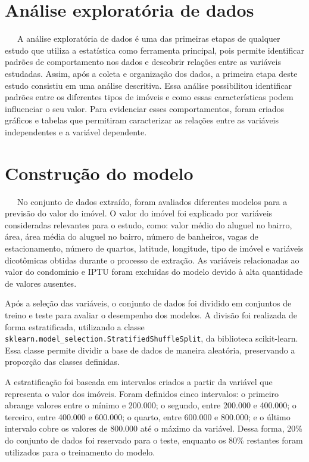 \documentclass[
  12pt,
  a4paper,
]{scrreprt}
\begin{document}
\section{Análise exploratória de
dados}\label{anuxe1lise-exploratuxf3ria-de-dados}

~~~A análise exploratória de dados é uma das primeiras etapas de
qualquer estudo que utiliza a estatística como ferramenta principal,
pois permite identificar padrões de comportamento nos dados e descobrir
relações entre as variáveis estudadas. Assim, após a coleta e
organização dos dados, a primeira etapa deste estudo consistiu em uma
análise descritiva. Essa análise possibilitou identificar padrões entre
os diferentes tipos de imóveis e como essas características podem
influenciar o seu valor. Para evidenciar esses comportamentos, foram
criados gráficos e tabelas que permitiram caracterizar as relações entre
as variáveis independentes e a variável dependente.

\section{Construção do modelo}\label{construuxe7uxe3o-do-modelo}

~~~No conjunto de dados extraído, foram avaliados diferentes modelos
para a previsão do valor do imóvel. O valor do imóvel foi explicado por
variáveis consideradas relevantes para o estudo, como: valor médio do
aluguel no bairro, área, área média do aluguel no bairro, número de
banheiros, vagas de estacionamento, número de quartos, latitude,
longitude, tipo de imóvel e variáveis dicotômicas obtidas durante o
processo de extração. As variáveis relacionadas ao valor do condomínio e
IPTU foram excluídas do modelo devido à alta quantidade de valores
ausentes.

\vspace{12pt}

Após a seleção das variáveis, o conjunto de dados foi dividido em
conjuntos de treino e teste para avaliar o desempenho dos modelos. A
divisão foi realizada de forma estratificada, utilizando a classe
\texttt{sklearn.model\_selection.StratifiedShuffleSplit}, da biblioteca
scikit-learn. Essa classe permite dividir a base de dados de maneira
aleatória, preservando a proporção das classes definidas.

\vspace{12pt}

A estratificação foi baseada em intervalos criados a partir da variável
que representa o valor dos imóveis. Foram definidos cinco intervalos: o
primeiro abrange valores entre o mínimo e 200.000; o segundo, entre
200.000 e 400.000; o terceiro, entre 400.000 e 600.000; o quarto, entre
600.000 e 800.000; e o último intervalo cobre os valores de 800.000 até
o máximo da variável. Dessa forma, 20\% do conjunto de dados foi
reservado para o teste, enquanto os 80\% restantes foram utilizados para
o treinamento do modelo.
\end{document}
